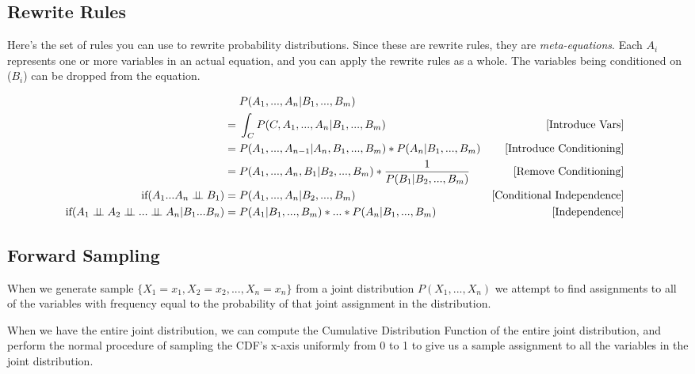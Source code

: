 \documentclass[]{article}
\def\ci{\perp\!\!\!\perp}
\begin{document}
\subsection{Rewrite Rules}

Here's the set of rules you can use to rewrite probability distributions. Since these are rewrite rules, they are \emph{meta-equations}. Each $A_i$ represents one or more variables in an actual equation, and you can apply the rewrite rules as a whole. The variables being conditioned on ($B_i$) can be dropped from the equation.



\begin{align*}
\setlength{\jot}{18pt}
 											              & \;P(A_1, ..., A_n | B_1, ..., B_m) & \\
  				                                        = & \; \int_C P(C,A_1, ..., A_n | B_1, ..., B_m)& \mbox{[Introduce Vars]\;\;}\\
		                                                = & \; P(A_1, ..., A_{n-1} | A_n, B_1, ..., B_m)*P(A_n | B_1, ..., B_m) &  \mbox{[Introduce Conditioning]\;\;}\\
 			                                            = & \; P(A_1, ..., A_n, B_1 | B_2, ..., B_m)*\frac{1}{P(B_1|B_2, ..., B_m)} & \mbox{[Remove Conditioning]\;\;} \\
 \mbox{if} (A_1 ... A_n \ci B_1)                        = & \; P(A_1, ..., A_n | B_2, ..., B_m) &  \mbox{[Conditional Independence]\;\;} 		 \\
 \mbox{if} (A_1 \ci A_2 \ci ... \ci A_n | B_1 ... B_n)  = & \; P(A_1 | B_1, ..., B_m) * ... * P(A_n | B_1, ..., B_m) & \mbox{[Independence]\;\;} 					 \\
\end{align*}

\subsection{Forward Sampling}

When we generate sample $\{X_1 = x_1, X_2 = x_2, ..., X_n = x_n\}$ from a joint distribution $P(X_1, ..., X_n)$ we attempt to find assignments to all of the variables with frequency equal to the probability of that joint assignment in the distribution.

When we have the entire joint distribution, we can compute the Cumulative Distribution Function of the entire joint distribution, and perform the normal procedure of sampling the CDF's x-axis uniformly from 0 to 1 to give us a sample assignment to all the variables in the joint distribution.
\end{document}
